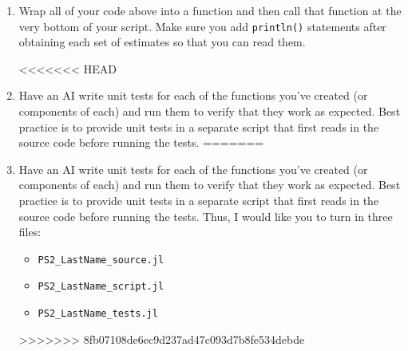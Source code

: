 \documentclass[12pt,english]{article}
\begin{document}
\begin{enumerate}
\item Wrap all of your code above into a function and then call that function at the very bottom of your script. Make sure you add \texttt{println()} statements after obtaining each set of estimates so that you can read them.

<<<<<<< HEAD
\item Have an AI write unit tests for each of the functions you've created (or components of each) and run them to verify that they work as expected. Best practice is to provide unit tests in a separate script that first reads in the source code before running the tests.
=======
\item Have an AI write unit tests for each of the functions you've created (or components of each) and run them to verify that they work as expected. Best practice is to provide unit tests in a separate script that first reads in the source code before running the tests. Thus, I would like you to turn in three files:
    \begin{itemize}
        \item \texttt{PS2\_LastName\_source.jl}
        \item \texttt{PS2\_LastName\_script.jl}
        \item \texttt{PS2\_LastName\_tests.jl}
    \end{itemize}
>>>>>>> 8fb07108de6ec9d237ad47c093d7b8fe534debde

\end{enumerate}
\end{document}
